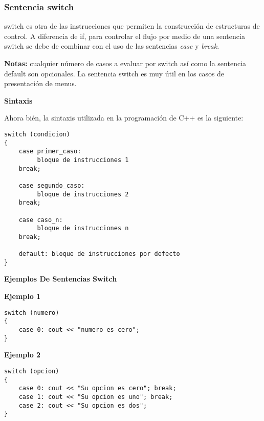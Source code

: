 \subsubsection{Sentencia switch}

switch es otra de las instrucciones que permiten la construcción de estructuras de control. A diferencia de if, para controlar el flujo por medio de una sentencia switch se debe de combinar con el uso de las sentencias \textit{case} y \textit{break}.

\textbf{Notas:} cualquier número de casos a evaluar por switch así como la sentencia default son opcionales. La sentencia switch es muy útil en los casos de presentación de menus.

\begin{center}
	\textbf{Sintaxis}
\end{center}
Ahora bién, la sintaxis utilizada en la programación de C++ es la siguiente:

\begin{lstlisting}[style=Cpp, label=sintaxis-switch, caption=Sintaxis Switch]
switch (condicion)
{
    case primer_caso:
         bloque de instrucciones 1
    break;

    case segundo_caso:
         bloque de instrucciones 2
    break;

    case caso_n:
         bloque de instrucciones n
    break;

    default: bloque de instrucciones por defecto
}
\end{lstlisting}

\begin{center}
	\textbf{Ejemplos De Sentencias Switch}
\end{center}

\textbf{Ejemplo 1}

\begin{lstlisting}[style=Cpp, label=switch-ejemplo-1, caption=Switch Ejemplo 1]
switch (numero)
{
    case 0: cout << "numero es cero";
}
\end{lstlisting}

\textbf{Ejemplo 2}

\begin{lstlisting}[style=Cpp, label=switch-ejemplo-2, caption=Switch Ejemplo 2]
switch (opcion)
{
    case 0: cout << "Su opcion es cero"; break;
    case 1: cout << "Su opcion es uno"; break;
    case 2: cout << "Su opcion es dos";
}
\end{lstlisting}


